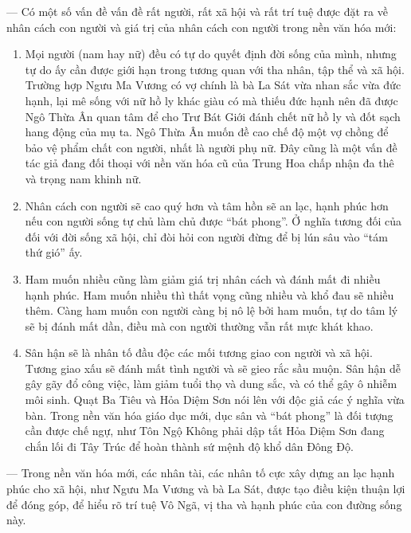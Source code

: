 — Có một số vấn đề vấn đề rất người, rất xã hội và rất trí tuệ được đặt ra về nhân cách con người và giá trị của nhân cách con người trong nền văn hóa mới:

\begin{enumerate}[label=\itshape\alph*\upshape)]

    \item Mọi người (nam hay nữ) đều có tự do quyết định đời sống của mình, nhưng tự do ấy cần được giới hạn trong tương quan với tha nhân, tập thể và xã hội. Trường hợp Ngưu Ma Vương có vợ chính là bà La Sát vừa nhan sắc vừa đức hạnh, lại mê sống với nữ hồ ly khác giàu có mà thiếu đức hạnh nên đã được Ngô Thừa Ân quan tâm để cho Trư Bát Giới đánh chết nữ hồ ly và đốt sạch hang động của mụ ta. Ngô Thừa Ân muốn đề cao chế độ một vợ chồng để bảo vệ phẩm chất con người, nhất là người phụ nữ. Đây cũng là một vấn đề tác giả đang đối thoại với nền văn hóa cũ của Trung Hoa chấp nhận đa thê và trọng nam khinh nữ.

    \item Nhân cách con người sẽ cao quý hơn và tâm hồn sẽ an lạc, hạnh phúc hơn nếu con người sống tự chủ làm chủ được ``bát phong''. Ở nghĩa tương đối của đối với đời sống xã hội, chỉ đòi hỏi con người đừng để bị lún sâu vào ``tám thứ gió'' ấy.

    \item Ham muốn nhiều cũng làm giảm giá trị nhân cách và đánh mất đi nhiều hạnh phúc. Ham muốn nhiều thì thất vọng cũng nhiều và khổ đau sẽ nhiều thêm. Càng ham muốn con người càng bị nô lệ bởi ham muốn, tự do tâm lý sẽ bị đánh mất dần, điều mà con người thường vẫn rất mực khát khao.

    \item Sân hận sẽ là nhân tố đầu độc các mối tương giao con người và xã hội. Tương giao xấu sẽ đánh mất tình người và sẽ gieo rắc sầu muộn. Sân hận dễ gây gãy đổ công việc, làm giảm tuổi thọ và dung sắc, và có thể gây ô nhiễm môi sinh. Quạt Ba Tiêu và Hỏa Diệm Sơn nói lên với độc giả các ý nghĩa vừa bàn. Trong nền văn hóa giáo dục mới, dục sân và ``bát phong'' là đối tượng cần được chế ngự, như Tôn Ngộ Không phải dập tắt Hỏa Diệm Sơn đang chắn lối đi Tây Trúc để hoàn thành sứ mệnh độ khổ dân Đông Độ.
\end{enumerate}

— Trong nền văn hóa mới, các nhân tài, các nhân tố cực xây dựng an lạc hạnh phúc cho xã hội, như Ngưu Ma Vương và bà La Sát, được tạo điều kiện thuận lợi để đóng góp, để hiểu rõ trí tuệ Vô Ngã, vị tha và hạnh phúc của con đường sống này.

